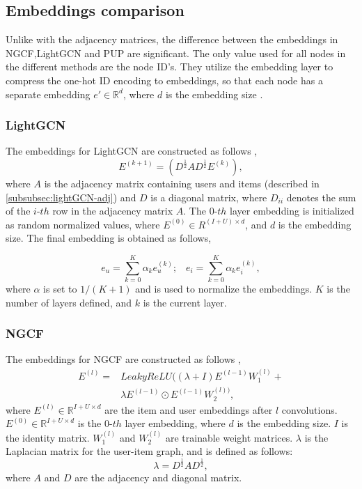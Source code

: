 \subsection{Embeddings comparison}
Unlike with the adjacency matrices, the difference between the embeddings in NGCF,LightGCN and PUP are significant.
The only value used for all nodes in the different methods are the node ID's.
They utilize the embedding layer to compress the one-hot ID encoding to embeddings, so that each node has a separate embedding $e' \in \mathbb{R}^d$, where $d$ is the embedding size \cite{Priceaware,lightgcn}.

\subsubsection{LightGCN}\label{subsubsec:lightgcn-embedding}
The embeddings for LightGCN are constructed as follows \cite{lightgcn},
\begin{equation}
    E^{(k+1)} = (D^{\frac{1}{2}}AD^{\frac{1}{2}}E^{(k)}),
\end{equation}
where $A$ is the adjacency matrix containing users and items (described in \autoref{subsubsec:lightGCN-adj}) and $D$ is a diagonal matrix, where $D_{ii}$ denotes the sum of the $i$-$th$ row in the adjacency matrix $A$.
The $0$-$th$ layer embedding is initialized as random normalized values, where $E^{(0)} \in R^{(I + U)\times d}$, and $d$ is the embedding size.
The final embedding is obtained as follows,

\begin{equation}
    e_u = \sum_{k=0}^{K} \alpha_k e_u^{(k)};\;\;\; e_i = \sum_{k=0}^{K} \alpha_k e_i^{(k)},
\end{equation}
where $\alpha$ is set to $1/(K + 1)$ and is used to normalize the embeddings.
$K$ is the number of layers defined, and $k$ is the current layer.

\subsubsection{NGCF}\label{subsubsec:NGCF-embed}
The embeddings for NGCF are constructed as follows \cite{NGCF_2019},
\begin{equation}
    \begin{split}
        E^{(l)} = &LeakyReLU((\lambda + I)E^{(l-1)}W_1^{(l)}+\\
        & \lambda E^{(l-1)}\odot E^{(l-1)}W_2^{(l))},
    \end{split}
\end{equation}
where $E^{(l)} \in \mathbb{R}^{I+U \times d}$ are the item and user embeddings after $l$ convolutions.
$E^{(0)} \in \mathbb{R}^{I+U \times d}$ is the $0$-$th$ layer embedding, where $d$ is the embedding size.
$I$ is the identity matrix.
$W_1^{(l)}$ and $W_2^{(l)}$ are trainable weight matrices.
$\lambda$ is the Laplacian matrix for the user-item graph, and is defined as follows:
\begin{equation}
    \lambda = D^{\frac{1}{2}}AD^{\frac{1}{2}},
\end{equation}
where $A$ and $D$ are the adjacency and diagonal matrix.

